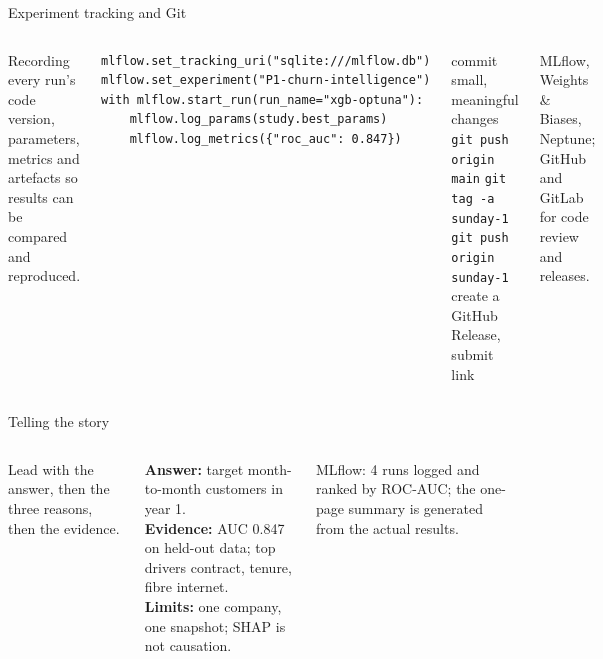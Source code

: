 \documentclass[aspectratio=169,11pt]{beamer}
\begin{document}
\begin{frame}[fragile]{Experiment tracking and Git}
\begin{columns}[T]
\begin{bdef}
Recording every run's code version, parameters, metrics and artefacts so results can be compared and reproduced.
\end{bdef}
\begin{bcode}
\begin{lstlisting}
mlflow.set_tracking_uri("sqlite:///mlflow.db")
mlflow.set_experiment("P1-churn-intelligence")
with mlflow.start_run(run_name="xgb-optuna"):
    mlflow.log_params(study.best_params)
    mlflow.log_metrics({"roc_auc": 0.847})
\end{lstlisting}
\end{bcode}
\begin{balgo}
\begin{algorithmic}[1]
\State commit small, meaningful changes
\State \texttt{git push origin main}
\State \texttt{git tag -a sunday-1}
\State \texttt{git push origin sunday-1}
\State create a GitHub Release, submit link
\end{algorithmic}
\end{balgo}
\begin{bapp}
MLflow, Weights \& Biases, Neptune; GitHub and GitLab for code review and releases.
\end{bapp}
\end{columns}
\end{frame}

\begin{frame}{Telling the story}
\begin{columns}[T]
\begin{bdef}
Lead with the answer, then the three reasons, then the evidence.
\end{bdef}
\begin{bex}
\textbf{Answer:} target month-to-month customers in year 1.\\
\textbf{Evidence:} AUC 0.847 on held-out data; top drivers contract, tenure, fibre internet.\\
\textbf{Limits:} one company, one snapshot; SHAP is not causation.
\end{bex}
\begin{bres}
MLflow: 4 runs logged and ranked by ROC-AUC; the one-page summary is generated from the actual results.
\end{bres}
\end{columns}
\end{frame}
\end{document}
